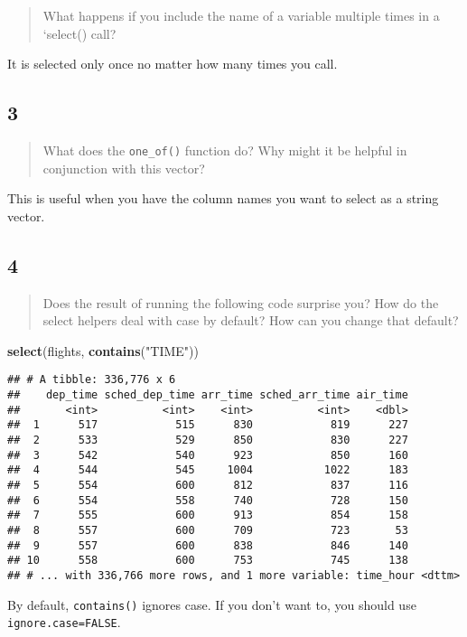 \documentclass[]{article}
\newenvironment{Shaded}{\begin{snugshade}}{\end{snugshade}}
\newcommand{\KeywordTok}[1]{\textcolor[rgb]{0.13,0.29,0.53}{\textbf{#1}}}
\newcommand{\NormalTok}[1]{#1}
\newcommand{\StringTok}[1]{\textcolor[rgb]{0.31,0.60,0.02}{#1}}
\begin{document}
\begin{quote}
What happens if you include the name of a variable multiple times in a
`select() call?
\end{quote}

It is selected only once no matter how many times you call.

\hypertarget{section-3}{%
\subsection{3}\label{section-3}}

\begin{quote}
What does the \texttt{one\_of()} function do? Why might it be helpful in
conjunction with this vector?
\end{quote}

This is useful when you have the column names you want to select as a
string vector.

\hypertarget{section-4}{%
\subsection{4}\label{section-4}}

\begin{quote}
Does the result of running the following code surprise you? How do the
select helpers deal with case by default? How can you change that
default?
\end{quote}

\begin{Shaded}
\begin{Highlighting}[]
\KeywordTok{select}\NormalTok{(flights, }\KeywordTok{contains}\NormalTok{(}\StringTok{"TIME"}\NormalTok{))}
\end{Highlighting}
\end{Shaded}

\begin{verbatim}
## # A tibble: 336,776 x 6
##    dep_time sched_dep_time arr_time sched_arr_time air_time
##       <int>          <int>    <int>          <int>    <dbl>
##  1      517            515      830            819      227
##  2      533            529      850            830      227
##  3      542            540      923            850      160
##  4      544            545     1004           1022      183
##  5      554            600      812            837      116
##  6      554            558      740            728      150
##  7      555            600      913            854      158
##  8      557            600      709            723       53
##  9      557            600      838            846      140
## 10      558            600      753            745      138
## # ... with 336,766 more rows, and 1 more variable: time_hour <dttm>
\end{verbatim}

By default, \texttt{contains()} ignores case. If you don't want to, you
should use \texttt{ignore.case=FALSE}.
\end{document}
